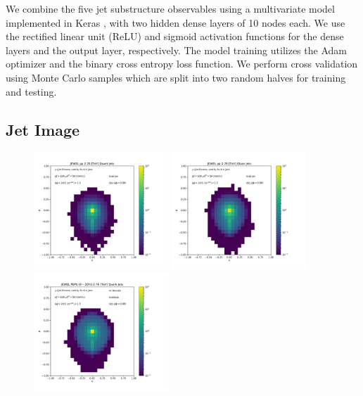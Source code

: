\documentclass[notoc,preprintnumbers]{JHEP3}
\begin{document}
We combine the five jet substructure observables using a multivariate model implemented in Keras \cite{keras}, with two hidden dense layers of 10 nodes each. We use the rectified linear unit (ReLU) \cite{nair2010rectified} and sigmoid activation functions for the dense layers and the output layer, respectively. The model training utilizes the Adam optimizer \cite{adam} and the binary cross entropy loss function. We perform cross validation using Monte Carlo samples which are split into two random halves for training and testing.

\subsection{Jet Image}
\label{sec:image}

\begin{figure}[t]
\centering
\includegraphics[width=0.45\textwidth]{Fig3a}
\includegraphics[width=0.45\textwidth]{Fig3b}
\includegraphics[width=0.45\textwidth]{Fig3c}

\end{figure}
\end{document}

